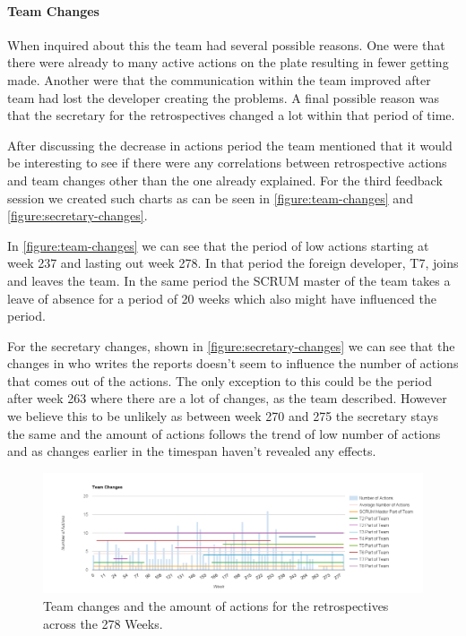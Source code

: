 \paragraph{Team Changes}

When inquired about this the team had several possible reasons. One were that there were already to many active actions on the plate resulting in fewer getting made. Another were that the communication within the team improved after team had lost the developer creating the problems. A final possible reason was that the secretary for the retrospectives changed a lot within that period of time. 

After discussing the decrease in actions period the team mentioned that it would be interesting to see if there were any correlations between retrospective actions and team changes other than the one already explained. For the third feedback session we created such charts as can be seen in \autoref{figure:team-changes} and \autoref{figure:secretary-changes}. 

In \autoref{figure:team-changes} we can see that the period of low actions starting at week 237 and lasting out week 278. In that period the foreign developer, T7, joins and leaves the team. In the same period the SCRUM master of the team takes a leave of absence for a period of 20 weeks which also might have influenced the period. 

For the secretary changes, shown in \autoref{figure:secretary-changes} we can see that the changes in who writes the reports doesn't seem to influence the number of actions that comes out of the actions. The only exception to this could be the period after week 263 where there are a lot of changes, as the team described. However we believe this to be unlikely as between week 270 and 275 the secretary stays the same and the amount of actions follows the trend of low number of actions and as changes earlier in the timespan haven't revealed any effects. 

\begin{figure}
	\centering
	\includegraphics[width=\textwidth, keepaspectratio]{figures/team-changes.png}
	\caption{Team changes and the amount of actions for the retrospectives across the 278 Weeks.}
	\label{figure:team-changes}
\end{figure}

